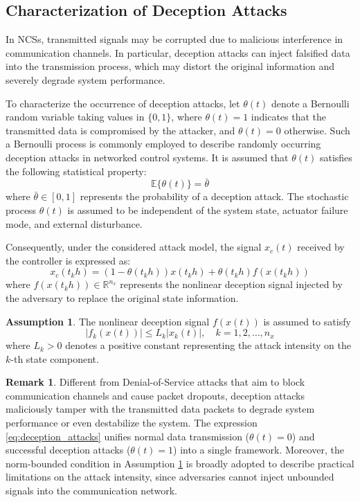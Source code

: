 \documentclass[preprint,review,fleqn,sort&compress,3p]{elsarticle}
\theoremstyle{definition} %
\theoremstyle{definition}%
\newtheorem{rem}{Remark}[section]
\newtheorem{asptn}{Assumption}[section]
\begin{document}
	\subsection{Characterization of Deception Attacks}\label{sec2.3}
	In NCSs, transmitted signals may be corrupted due to malicious interference in communication channels. In particular, deception attacks can inject falsified data into the transmission process, which may distort the original information and severely degrade system performance.
	
	To characterize the occurrence of deception attacks, let $\theta(t)$ denote a Bernoulli random variable taking values in $\{0,1\}$, where $\theta(t)=1$ indicates that the transmitted data is compromised by the attacker, and $\theta(t) = 0$ otherwise. Such a Bernoulli process is commonly employed to describe randomly occurring deception attacks in networked control systems. It is assumed that $\theta(t)$ satisfies the following statistical property:
	\begin{equation}
		\mathbb{E}\{\theta(t)\} = \bar{\theta} 
	\end{equation}
	where $\bar{\theta} \in [0,1]$ represents the probability of a deception attack.
	The stochastic process $\theta(t)$ is assumed to be independent of the system state, actuator failure mode, and external disturbance.
	
	Consequently, under the considered attack model, the signal $x_c(t)$ received by the controller is expressed as:
	\begin{equation}\label{eq:deception_attacks}
		x_c(t_{k} h) = (1 - \theta(t_{k} h)) x(t_{k} h) + \theta(t_{k} h) f(x(t_{k} h))
	\end{equation}
	where $f(x(t_{k}h)) \in \mathbb{R}^{n_x}$ represents the nonlinear deception signal injected by the adversary to replace the original state information.
	
	\begin{asptn} \label{assump:attack_bound}
		The nonlinear deception signal $f(x(t))$ is assumed to satisfy
		\begin{equation}
			|f_k(x(t))| \le L_k |x_k(t)|,\quad k = 1,2,\ldots,n_x
		\end{equation}
		where $L_k > 0$ denotes a positive constant representing the attack intensity on the $k$-th state component.
	\end{asptn}
	\begin{rem}
		Different from Denial-of-Service attacks that aim to block communication channels
		and cause packet dropouts, deception attacks maliciously tamper with the transmitted data packets to
		degrade system performance or even destabilize the system. The expression \eqref{eq:deception_attacks} unifies normal data transmission ($\theta(t) = 0$) and successful deception attacks ($\theta(t) = 1$) into
		a single framework. Moreover, the norm-bounded condition in Assumption \ref{assump:attack_bound} is broadly adopted to
		describe practical limitations on the attack intensity, since adversaries cannot inject unbounded signals
		into the communication network.
	\end{rem}
	
\end{document}
